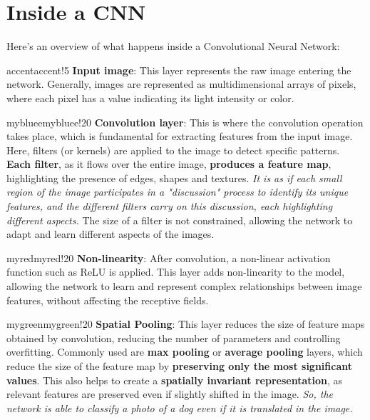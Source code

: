 \section{Inside a CNN}

Here's an overview of what happens inside a Convolutional Neural Network:  
\begin{remark}{accent}{accent!5}
\textbf{Input image}: This layer represents the raw image entering the network. Generally, images are represented as multidimensional arrays of pixels, where each pixel has a value indicating its light intensity or color.
\end{remark}

\begin{remark}{mybluee}{mybluee!20}
\textbf{Convolution layer}: This is where the convolution operation takes place, which is fundamental for extracting features from the input image. Here, filters (or kernels) are applied to the image to detect specific patterns. \textbf{Each filter}, as it flows over the entire image, \textbf{produces a feature map}, highlighting the presence of edges, shapes and textures. \textit{It is as if each small region of the image participates in a "discussion" process to identify its unique features, and the different filters carry on this discussion, each highlighting different aspects.} The size of a filter is not constrained, allowing the network to adapt and learn different aspects of the images.
\end{remark}


\begin{remark}{myred}{myred!20}
\textbf{Non-linearity}: After convolution, a non-linear activation function such as ReLU is applied. This layer adds non-linearity to the model, allowing the network to learn and represent complex relationships between image features, without affecting the
receptive fields. 
\end{remark}

\begin{remark}{mygreen}{mygreen!20}
\textbf{Spatial Pooling}: This layer reduces the size of feature maps obtained by convolution, reducing the number of parameters and controlling overfitting. Commonly used are \textbf{max pooling} or \textbf{average pooling} layers, which reduce the size of the feature map by \textbf{preserving only the most significant values}. This also helps to create a \textbf{spatially invariant representation}, as relevant features are preserved even if slightly shifted in the image. \textit{So, the network is able to classify a photo of a dog even if it is translated in the image.}
\end{remark}

